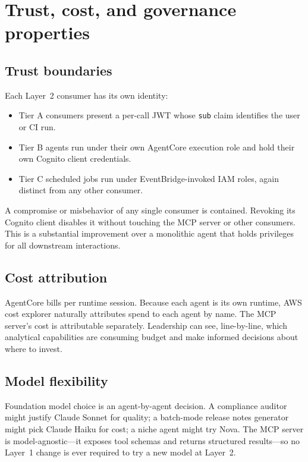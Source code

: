 \documentclass[11pt,letterpaper]{article}
\begin{document}
\section{Trust, cost, and governance properties}

\subsection{Trust boundaries}

Each Layer~2 consumer has its own identity:

\begin{itemize}[leftmargin=*, itemsep=2pt]
  \item Tier A consumers present a per-call JWT whose \texttt{sub}
        claim identifies the user or CI run.
  \item Tier B agents run under their own AgentCore execution role
        and hold their own Cognito client credentials.
  \item Tier C scheduled jobs run under EventBridge-invoked IAM
        roles, again distinct from any other consumer.
\end{itemize}

\noindent
A compromise or misbehavior of any single consumer is contained. Revoking
its Cognito client disables it without touching the MCP server or other
consumers. This is a substantial improvement over a monolithic agent that
holds privileges for all downstream interactions.

\subsection{Cost attribution}

AgentCore bills per runtime session. Because each agent is its own
runtime, AWS cost explorer naturally attributes spend to each agent by
name. The MCP server's cost is attributable separately. Leadership can
see, line-by-line, which analytical capabilities are consuming budget
and make informed decisions about where to invest.

\subsection{Model flexibility}

Foundation model choice is an agent-by-agent decision. A compliance
auditor might justify Claude Sonnet for quality; a batch-mode release
notes generator might pick Claude Haiku for cost; a niche agent might
try Nova. The MCP server is model-agnostic---it exposes tool schemas
and returns structured results---so no Layer~1 change is ever required
to try a new model at Layer~2.
\end{document}
